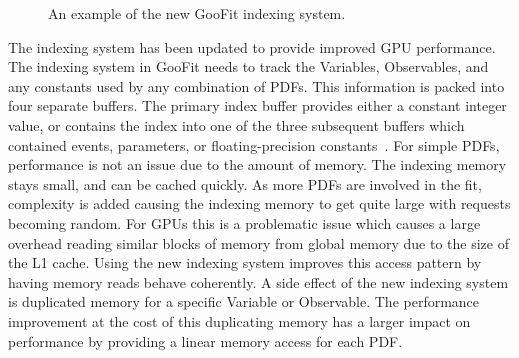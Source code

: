 \documentclass{webofc}
\begin{document}
\begin{figure}
\caption{An example of the new GooFit indexing system.}
\label{fig-indexing-new}
\end{figure}

The indexing system has been updated to provide improved GPU performance. The indexing system in GooFit needs to track the Variables, Observables, and any constants used by any combination of PDFs. This information is packed into four separate buffers. The primary index buffer provides either a constant integer value, or contains the index into one of the three subsequent buffers which contained events, parameters, or floating-precision constants~\cite{lib:GooFit:main}. For simple PDFs, performance is not an issue due to the amount of memory. The indexing memory stays small, and can be cached quickly. As more PDFs are involved in the fit, complexity is added causing the indexing memory to get quite large with requests becoming random. For GPUs this is a problematic issue which causes a large overhead reading similar blocks of memory from global memory due to the size of the L1 cache. Using the new indexing system improves this access pattern by having memory reads behave coherently. A side effect of the new indexing system is duplicated memory for a specific Variable or Observable. The performance improvement at the cost of this duplicating memory has a larger impact on performance by providing a linear memory access for each PDF.
\end{document}
